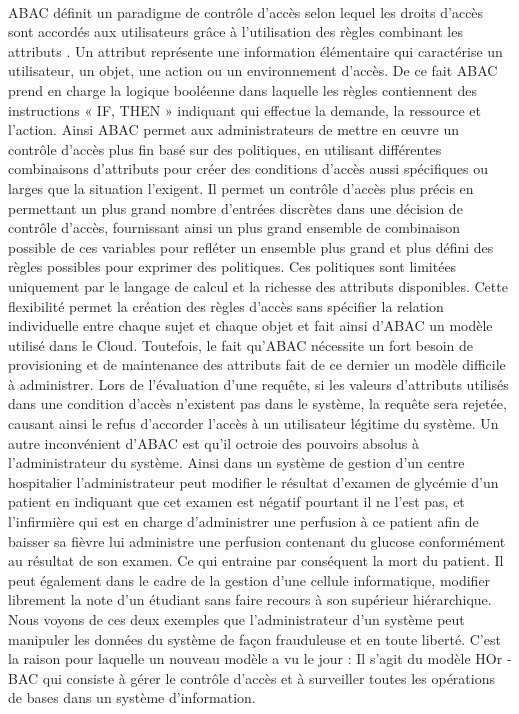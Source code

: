 \paragraph{} ABAC définit un paradigme de contrôle d'accès selon lequel les droits d'accès sont accordés aux utilisateurs grâce à l'utilisation des règles combinant les attributs \cite{Vin15}. Un attribut représente une information élémentaire qui caractérise un utilisateur, un objet, une action ou un environnement d'accès. De ce fait ABAC prend en charge la logique booléenne dans laquelle les règles contiennent des instructions « IF, THEN » indiquant qui effectue la demande, la ressource et l'action. Ainsi ABAC permet aux administrateurs de mettre en œuvre un contrôle d'accès plus fin basé sur des politiques, en utilisant différentes combinaisons d'attributs pour créer des conditions d'accès aussi spécifiques ou larges que la situation l'exigent. Il permet un contrôle d'accès plus précis en permettant un plus grand nombre d'entrées discrètes dans une décision de contrôle d'accès, fournissant ainsi un plus grand ensemble de combinaison possible de ces variables pour refléter un ensemble plus grand et plus défini des règles possibles pour exprimer des politiques. Ces politiques sont limitées uniquement par le langage de calcul et la richesse des attributs disponibles. Cette flexibilité permet la création des règles d'accès sans spécifier la relation individuelle entre chaque sujet et chaque objet \cite{Vin15} et fait ainsi d'ABAC un modèle utilisé dans le Cloud. Toutefois, le fait qu'ABAC nécessite un fort besoin de provisioning et de maintenance des attributs fait de ce dernier un modèle difficile à administrer. Lors de l'évaluation d'une requête, si les valeurs d'attributs utilisés dans une condition d'accès n'existent pas dans le système,  la requête  sera rejetée, causant ainsi le refus d'accorder l'accès à un utilisateur légitime du système. Un autre inconvénient d'ABAC est qu'il octroie des pouvoirs absolus à l'administrateur du système. Ainsi dans un système de gestion d'un centre hospitalier l'administrateur peut modifier le résultat d'examen de glycémie d'un patient en indiquant que cet examen est négatif pourtant  il ne l'est pas,  et l'infirmière qui est en charge d'administrer une perfusion à ce patient afin de baisser sa fièvre lui administre une perfusion contenant du glucose conformément au résultat de son examen. Ce qui entraine par conséquent la mort du patient. Il peut également dans le cadre de la gestion d'une cellule informatique, modifier librement la note d'un étudiant sans faire recours à son supérieur hiérarchique. Nous voyons de ces deux exemples que l'administrateur d'un système peut manipuler les données du système de façon frauduleuse et en toute liberté. C'est la raison pour laquelle un nouveau modèle a vu le jour : Il s'agit du modèle HOr -BAC qui consiste à gérer le contrôle d'accès et à surveiller toutes les opérations de bases dans un système d'information.
